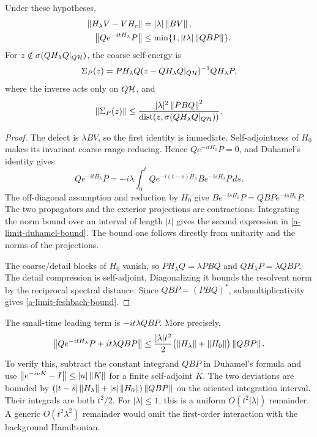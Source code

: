 \begin{proposition}
\label{a-limit-leakage-bounds}
Under these hypotheses,
\begin{align}
 \left\lVert H_\lambda V-VH_c\right\rVert&=|\lambda|\left\lVert BV\right\rVert,
 \label{a-limit-defect-norm}\\
 \left\lVert Qe^{-itH_\lambda}P\right\rVert
 &\leq\min\{1,|t\lambda|\left\lVert QBP\right\rVert\}.
 \label{a-limit-duhamel-bound}
\end{align}
For $z\notin\sigma(QH_\lambda Q|_{Q\mathcal H})$, the coarse self-energy is
\begin{equation}
 \Sigma_P(z)=PH_\lambda Q
 (z-QH_\lambda Q|_{Q\mathcal H})^{-1}QH_\lambda P,
 \label{a-limit-feshbach-definition}
\end{equation}
where the inverse acts only on $Q\mathcal H$, and
\begin{equation}
 \left\lVert\Sigma_P(z)\right\rVert
 \leq\frac{|\lambda|^2\left\lVert PBQ\right\rVert^2}
 {\operatorname{dist}(z,\sigma(QH_\lambda Q|_{Q\mathcal H}))}.
 \label{a-limit-feshbach-bound}
\end{equation}
\end{proposition}
\begin{proof}
The defect is $\lambda BV$, so the first identity is immediate.
Self-adjointness of $H_0$ makes its invariant coarse range reducing.
Hence $Qe^{-itH_0}P=0$, and Duhamel's identity gives
\[
 Qe^{-itH_\lambda}P
 =-i\lambda\int_0^t
 Qe^{-i(t-s)H_\lambda}B e^{-isH_0}P\,ds.
\]
The off-diagonal assumption and reduction by $H_0$ give
$B e^{-isH_0}P=QBP e^{-isH_0}P$. The two propagators and the exterior
projections are contractions. Integrating the norm bound over an
interval of length $|t|$ gives the second expression in
\eqref{a-limit-duhamel-bound}. The bound one follows directly from
unitarity and the norms of the projections.

The coarse/detail blocks of $H_0$ vanish, so
$PH_\lambda Q=\lambda PBQ$ and $QH_\lambda P=\lambda QBP$.
The detail compression is self-adjoint. Diagonalizing it bounds the
resolvent norm by the reciprocal spectral distance. Since
$QBP=(PBQ)^*$, submultiplicativity gives
\eqref{a-limit-feshbach-bound}.
\end{proof}

The small-time leading term is $-it\lambda QBP$. More precisely,
\begin{equation}
 \left\lVert Qe^{-itH_\lambda}P+it\lambda QBP\right\rVert
 \leq\frac{|\lambda|t^2}{2}
 \bigl(\left\lVert H_\lambda\right\rVert+\left\lVert H_0\right\rVert\bigr)\left\lVert QBP\right\rVert.
 \label{a-limit-shorttime-remainder}
\end{equation}
To verify this, subtract the constant integrand $QBP$ in Duhamel's
formula and use $\left\lVert e^{-iuK}-I\right\rVert\leq|u|\left\lVert K\right\rVert$ for a finite
self-adjoint $K$. The two deviations are bounded by
$(|t-s|\left\lVert H_\lambda\right\rVert+|s|\left\lVert H_0\right\rVert)\left\lVert QBP\right\rVert$ on the oriented
integration interval. Their integrals are both $t^2/2$.
For $|\lambda|\leq1$, this is a uniform $O(t^2|\lambda|)$ remainder.
A generic $O(t^2\lambda^2)$ remainder would omit the first-order
interaction with the background Hamiltonian.

